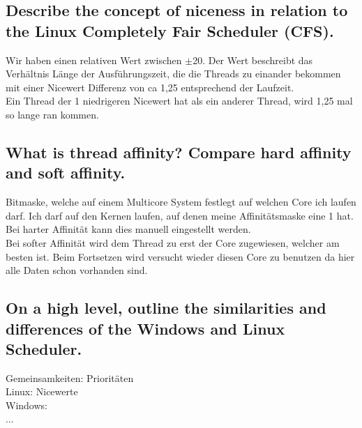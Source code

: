 \subsection{Describe the concept of niceness in relation to the Linux Completely Fair Scheduler (CFS).}
Wir haben einen relativen Wert zwischen $\pm$20. Der Wert beschreibt das Verh\"altnis L\"ange der Ausf\"uhrungszeit, die die Threads zu einander bekommen mit einer Nicewert Differenz von ca 1,25 entsprechend der Laufzeit.\\Ein Thread der 1 niedrigeren Nicewert hat als ein anderer Thread, wird 1,25 mal so lange ran kommen.

\subsection{What is thread affinity? Compare hard affinity and soft affinity.}
Bitmaske, welche auf einem Multicore System festlegt auf welchen Core ich laufen darf. Ich darf auf den Kernen laufen, auf denen meine Affinit\"atsmaske eine 1 hat.\\
Bei harter Affinit\"at kann dies manuell eingestellt werden.\\
Bei softer Affinit\"at wird dem Thread zu erst der Core zugewiesen, welcher am besten ist. Beim Fortsetzen wird versucht wieder diesen Core zu benutzen da hier alle Daten schon vorhanden sind.

\subsection{\important On a high level, outline the similarities and differences of the Windows and Linux Scheduler.}
Gemeinsamkeiten: Priorit\"aten\\
Linux: Nicewerte\\
Windows: \\
$\dots$\\
\missing